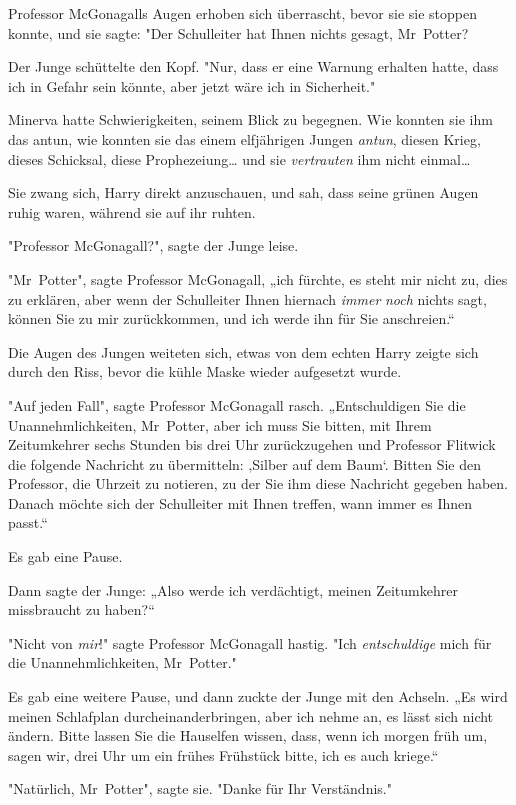 {Professor McGonagalls Augen erhoben sich überrascht, bevor sie sie stoppen konnte, und sie sagte: "Der Schulleiter hat Ihnen nichts gesagt, Mr~Potter?

Der Junge schüttelte den Kopf. "Nur, dass er eine Warnung erhalten hatte, dass ich in Gefahr sein könnte, aber jetzt wäre ich in Sicherheit."

Minerva hatte Schwierigkeiten, seinem Blick zu begegnen. Wie konnten sie ihm das antun, wie konnten sie das einem elfjährigen Jungen \emph{antun}, diesen Krieg, dieses Schicksal, diese Prophezeiung… und sie \emph{vertrauten} ihm nicht einmal…

Sie zwang sich, Harry direkt anzuschauen, und sah, dass seine grünen Augen ruhig waren, während sie auf ihr ruhten.

"Professor McGonagall?", sagte der Junge leise.

"Mr~Potter", sagte Professor McGonagall, „ich fürchte, es steht mir nicht zu, dies zu erklären, aber wenn der Schulleiter Ihnen hiernach \emph{immer} \emph{noch} nichts sagt, können Sie zu mir zurückkommen, und ich werde ihn für Sie anschreien.“

Die Augen des Jungen weiteten sich, etwas von dem echten Harry zeigte sich durch den Riss, bevor die kühle Maske wieder aufgesetzt wurde.

"Auf jeden Fall", sagte Professor McGonagall rasch. „Entschuldigen Sie die Unannehmlichkeiten, Mr~Potter, aber ich muss Sie bitten, mit Ihrem Zeitumkehrer sechs Stunden bis drei Uhr zurückzugehen und Professor Flitwick die folgende Nachricht zu übermitteln: ‚Silber auf dem Baum`. Bitten Sie den Professor, die Uhrzeit zu notieren, zu der Sie ihm diese Nachricht gegeben haben. Danach möchte sich der Schulleiter mit Ihnen treffen, wann immer es Ihnen passt.“

Es gab eine Pause.

Dann sagte der Junge: „Also werde ich verdächtigt, meinen Zeitumkehrer missbraucht zu haben?“

"Nicht von \emph{mir}!" sagte Professor McGonagall hastig. "Ich \emph{entschuldige} mich für die Unannehmlichkeiten, Mr~Potter."

Es gab eine weitere Pause, und dann zuckte der Junge mit den Achseln. „Es wird meinen Schlafplan durcheinanderbringen, aber ich nehme an, es lässt sich nicht ändern. Bitte lassen Sie die Hauselfen wissen, dass, wenn ich morgen früh um, sagen wir, drei Uhr um ein frühes Frühstück bitte, ich es auch kriege.“

"Natürlich, Mr~Potter", sagte sie. "Danke für Ihr Verständnis."

}
